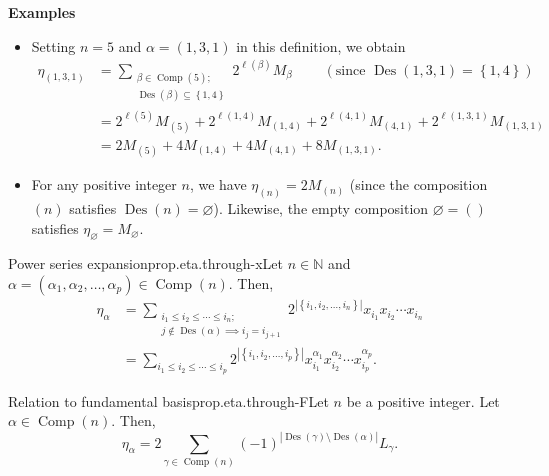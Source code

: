 \documentclass[numbers=enddot,12pt,final,onecolumn,notitlepage]{scrartcl}%
\newcommand{\NN}{\mathbb{N}} %
\newcommand{\Des}{\operatorname{Des}}
\newcommand{\Comp}{\operatorname{Comp}}
\newcommand{\0}{\phantom{c}}
\let\sumnonlimits\sum
\renewcommand{\sum}{\sumnonlimits\limits}
\begin{document}
\textbf{Examples}
\begin{itemize}
\item Setting $n=5$ and $\alpha=\left(  1,3,1\right)  $ in this
definition, we obtain%
\begin{align*}
\eta_{\left(  1,3,1\right)  }  &  =\sum_{\substack{\beta
\in \Comp(5);\\\Des\left(  \beta\right)  \subseteq
\left\{  1,4\right\}  }}2^{\ell\left(  \beta\right)  }M_{\beta}%
\ \ \ \ \ \ \ \ \ \ \left(\text{since }\Des\left(  1,3,1\right)  =\left\{
1,4\right\}  \right) \\
&  =2^{\ell\left(  5\right)  }M_{\left(  5\right)  }+2^{\ell\left(
1,4\right)  }M_{\left(  1,4\right)  }+2^{\ell\left(  4,1\right)  }M_{\left(
4,1\right)  }+2^{\ell\left(  1,3,1\right)  }M_{\left(  1,3,1\right)  }%
\\
&=2M_{\left(  5\right)  }+4M_{\left(  1,4\right)
}+4M_{\left(  4,1\right)  }+8M_{\left(  1,3,1\right)  }.
\end{align*}


\item For any positive integer $n$, we have $\eta_{\left(  n\right)
}=2M_{\left(  n\right)  }$
(since the composition $\left(n\right)$ satisfies
$\Des\left(n\right) = \varnothing$).
Likewise, the empty composition $\varnothing
=\left(  {}\right)  $ satisfies $\eta_{\varnothing}=M_{\varnothing}$.

\end{itemize}

\begin{proposition}{Power series expansion}{prop.eta.through-x}Let $n\in\NN$ and $\alpha=\left(  \alpha_{1},\alpha_{2}%
,\ldots,\alpha_{p}\right) \in
\Comp(n)$. Then,
\begin{align*}
\eta_{\alpha}
&=\sum_{\substack{i_{1}\leq i_{2}\leq\cdots\leq
i_{n}  ;\\j \notin \Des(\alpha) \implies i_j=i_{j+1}}}
2^{\left\vert \left\{  i_{1},i_{2}%
,\ldots,i_{n}\right\}  \right\vert }x_{i_{1}}x_{i_{2}}\cdots x_{i_{n}}
\\
&=\sum_{i_{1}\leq i_{2}\leq\cdots\leq i_{p}}2^{\left\vert \left\{
i_{1},i_{2},\ldots,i_{p}\right\}  \right\vert }x_{i_{1}}^{\alpha_{1}}x_{i_{2}%
}^{\alpha_{2}}\cdots x_{i_{p}}^{\alpha_{p}}.
\end{align*}
\end{proposition}

\begin{proposition}{Relation to fundamental basis}{prop.eta.through-F}Let $n$ be a positive integer. Let $\alpha
\in \Comp(n)$. Then,%
\[
\eta_{\alpha}=2\sum_{\gamma\in \Comp(n)}\left(
-1\right)  ^{\left\vert \Des\left(  \gamma\right)  \setminus \Des\left(
\alpha\right)  \right\vert }L_{\gamma}.
\]

\end{proposition}
\end{document}
